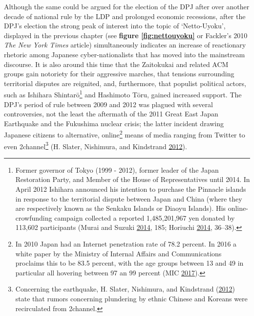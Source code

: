 \documentclass[10pt,british,A4paper,twoside]{memoir}
\begin{document}
Although the same could be argued for the election of the DPJ after over
another decade of national rule by the LDP and prolonged economic
recessions, after the DPJ's election the strong peak of interest into
the topic of `Netto-Uyoku', displayed in the previous chapter (see
\textbf{figure \ref{fig:nettouyoku}} or Fackler's 2010 \emph{The New
York Times} article) simultaneously indicates an increase of reactionary
rhetoric among Japanese cyber-nationalists that has moved into the
mainstream discourse. It is also around this time that the Zaitokukai
and related ACM groups gain notoriety for their aggressive marches, that
tensions surrounding territorial disputes are reignited, and,
furthermore, that populist political actors, such as Ishihara
Shintarō\footnote{Former governor of Tokyo (1999 - 2012), former leader
  of the Japan Restoration Party, and Member of the House of
  Representatives until 2014. In April 2012 Ishihara announced his
  intention to purchase the Pinnacle islands in response to the
  territorial dispute between Japan and China (where they are
  respectively known as the Senkaku Islands or Diaoyu Islands). His
  online-crowfunding campaign collected a reported 1,485,201,967 yen
  donated by 113,602 participants (Murai and Suzuki
  \protect\hyperlink{ref-hollihan_how_2014}{2014}, 185; Horiuchi
  \protect\hyperlink{ref-horiuchi_public_2014}{2014}, 36--38).} and
Hashimoto Tōru, gained increased support. The DPJ's period of rule
between 2009 and 2012 was plagued with several controversies, not the
least the aftermath of the 2011 Great East Japan Earthquake and the
Fukushima nuclear crisis; the latter incident drawing Japanese citizens
to alternative, online\footnote{In 2010 Japan had an Internet penetration rate
of 78.2 percent. In 2016 a white paper by the Ministry of
  Internal Affairs and Communications proclaims this to be 83.5 percent,
  with the age groups between 13 and 49 in particular all hovering
  between 97 an 99 percent (MIC
  \protect\hyperlink{ref-mic_communications_2017}{2017}).} means of
media ranging from Twitter to even 2channel\footnote{Concerning the
  earthquake, H. Slater, Nishimura, and Kindstrand
  (\protect\hyperlink{ref-h._slater_social_2012}{2012}) state that
  rumors concerning plundering by ethnic Chinese and Koreans were
  recirculated from 2channel.} (H. Slater, Nishimura, and Kindstrand
\protect\hyperlink{ref-h._slater_social_2012}{2012}).
\end{document}
